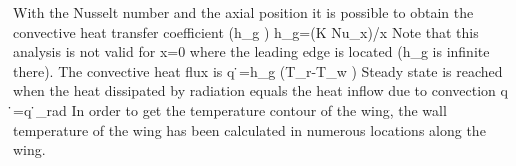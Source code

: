 With the Nusselt number and the axial position it is possible to obtain the convective heat transfer coefficient (h_g )
h_g=(K Nu_x)/x
Note that this analysis is not valid for x=0 where the leading edge is located (h_g is infinite there).
The convective heat flux is q ̇=h_g (T_r-T_w )
Steady state is reached when the heat dissipated by radiation equals the heat inflow due to convection q ̇=q ̇_rad
In order to get the temperature contour of the wing, the wall temperature of the wing has been calculated in numerous locations along the wing.



